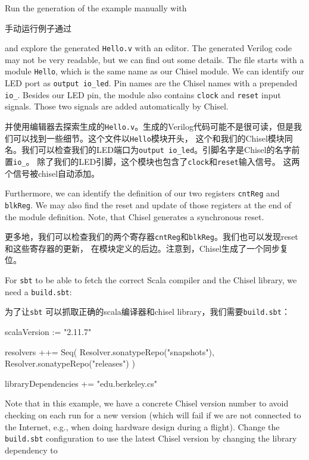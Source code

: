 \documentclass[%
    10pt,
    headinclude, footexclude,
    openright, %
    notitlepage,
    cleardoubleempty,
    headsepline,
    pointlessnumbers,
    bibtotoc, idxtotoc,
    ]{scrbook}
\newcommand{\code}[1]{{\small{\texttt{#1}}}}
\begin{document}

\noindent Run the generation of the example manually with

\noindent 手动运行例子通过


and explore the generated \code{Hello.v} with an editor. The generated Verilog code may not be
very readable, but we can find out some details. The file starts with a module \code{Hello},
which is the same name as our Chisel module. We can identify our LED port as
\code{output io\_led}. Pin names are the Chisel names with a prepended \code{io\_}.
Besides our LED pin, the module also contains \code{clock} and \code{reset} input signals.
Those two signals are added automatically by Chisel.

并使用编辑器去探索生成的\code{Hello.v}。生成的Verilog代码可能不是很可读，但是我们可以找到一些细节。这个文件以\code{Hello}模块开头，
这个和我们的Chisel模块同名。我们可以检查我们的LED端口为\code{output io\_led}。引脚名字是Chisel的名字前置\code{io\_}。
除了我们的LED引脚，这个模块也包含了\code{clock}和\code{reset}输入信号。
这两个信号被chisel自动添加。

Furthermore, we can identify the definition of our two registers \code{cntReg} and \code{blkReg}.
We may also find the reset and update of those registers at the end of the module definition.
Note, that Chisel generates a synchronous reset.

更多地，我们可以检查我们的两个寄存器\code{cntReg}和\code{blkReg}。我们也可以发现reset和这些寄存器的更新，
在模块定义的后边。注意到，Chisel生成了一个同步复位。

For \code{sbt} to be able to fetch the correct Scala compiler and the Chisel library,
we need a \code{build.sbt}:

为了让\code{sbt} 可以抓取正确的scala编译器和chisel library，我们需要\code{build.sbt}：

\begin{chisel}
scalaVersion := "2.11.7"

resolvers ++= Seq(
  Resolver.sonatypeRepo("snapshots"),
  Resolver.sonatypeRepo("releases")
)

libraryDependencies += "edu.berkeley.cs" %
\end{chisel}

\noindent Note that in this example, we have a concrete Chisel version number to avoid checking on
each run for a new version (which will fail if we are not connected to the Internet,
e.g., when doing hardware design during a flight).
Change the \code{build.sbt} configuration to use the latest Chisel version by changing the
library dependency to
\end{document}
